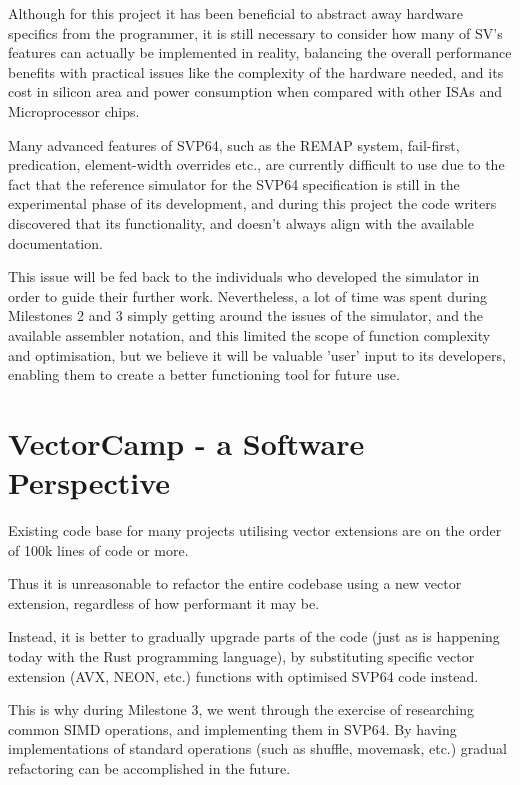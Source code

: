 Although for this project it has been beneficial to abstract away hardware
specifics from the programmer, it is still necessary to consider how many of
\acrshort{SV}'s features can actually be implemented in reality,
balancing the overall performance benefits with practical issues like the
complexity of the hardware needed, and its cost in silicon area and power
consumption when compared with other ISAs and Microprocessor chips.

Many advanced features of SVP64, such as the REMAP system, fail-first,
predication, element-width overrides etc., are currently difficult to use
due to the fact that the reference simulator for the SVP64 specification is
still in the experimental phase of its development, and during this project the
code writers discovered that its functionality, and doesn't always align with
the available documentation.

This issue will be fed back to the individuals who developed the simulator in
order to guide their further work. Nevertheless, a lot of time was spent
during Milestones 2 and 3 simply getting around the issues of the simulator,
and the available assembler notation, and this limited the scope of function
complexity and optimisation, but we believe it will be valuable 'user' input
to its developers, enabling them to create a better functioning tool
for future use.

\section{VectorCamp - a Software Perspective}
\label{sec:vecotorscansoftwareperspective}

Existing code base for many projects utilising vector extensions are on the
order of 100k lines of code or more.

Thus it is unreasonable to refactor the entire codebase using a new vector
extension, regardless of how performant it may be.

Instead, it is better to gradually upgrade parts of the code (just as is
happening today with the Rust programming language), by substituting specific
vector extension (AVX, NEON, etc.) functions with optimised SVP64 code instead.

This is why during Milestone 3, we went through the exercise of researching
common SIMD operations, and implementing them in SVP64. By having
implementations of standard operations (such as shuffle, movemask, etc.)
gradual refactoring can be accomplished in the future.

